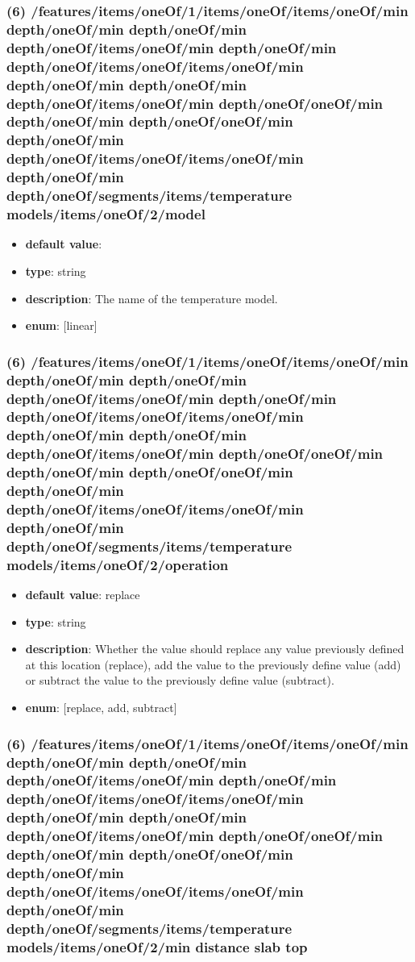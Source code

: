 \subsubsection{(6) /features/items/oneOf/1/items/oneOf/items/oneOf/min depth/oneOf/min depth/oneOf/min depth/oneOf/items/oneOf/min depth/oneOf/min depth/oneOf/items/oneOf/items/oneOf/min depth/oneOf/min depth/oneOf/min depth/oneOf/items/oneOf/min depth/oneOf/oneOf/min depth/oneOf/min depth/oneOf/oneOf/min depth/oneOf/min depth/oneOf/items/oneOf/items/oneOf/min depth/oneOf/min depth/oneOf/segments/items/temperature models/items/oneOf/2/model}
\begin{itemize}[leftmargin=6em]\item {\bf default value}: 
\item {\bf type}: string
\item {\bf description}: The name of the temperature model.
\item {\bf enum}: [linear]\end{itemize}\subsubsection{(6) /features/items/oneOf/1/items/oneOf/items/oneOf/min depth/oneOf/min depth/oneOf/min depth/oneOf/items/oneOf/min depth/oneOf/min depth/oneOf/items/oneOf/items/oneOf/min depth/oneOf/min depth/oneOf/min depth/oneOf/items/oneOf/min depth/oneOf/oneOf/min depth/oneOf/min depth/oneOf/oneOf/min depth/oneOf/min depth/oneOf/items/oneOf/items/oneOf/min depth/oneOf/min depth/oneOf/segments/items/temperature models/items/oneOf/2/operation}
\begin{itemize}[leftmargin=6em]\item {\bf default value}: replace
\item {\bf type}: string
\item {\bf description}: Whether the value should replace any value previously defined at this location (replace), add the value to the previously define value (add) or subtract the value to the previously define value (subtract).
\item {\bf enum}: [replace, add, subtract]\end{itemize}\subsubsection{(6) /features/items/oneOf/1/items/oneOf/items/oneOf/min depth/oneOf/min depth/oneOf/min depth/oneOf/items/oneOf/min depth/oneOf/min depth/oneOf/items/oneOf/items/oneOf/min depth/oneOf/min depth/oneOf/min depth/oneOf/items/oneOf/min depth/oneOf/oneOf/min depth/oneOf/min depth/oneOf/oneOf/min depth/oneOf/min depth/oneOf/items/oneOf/items/oneOf/min depth/oneOf/min depth/oneOf/segments/items/temperature models/items/oneOf/2/min distance slab top}
